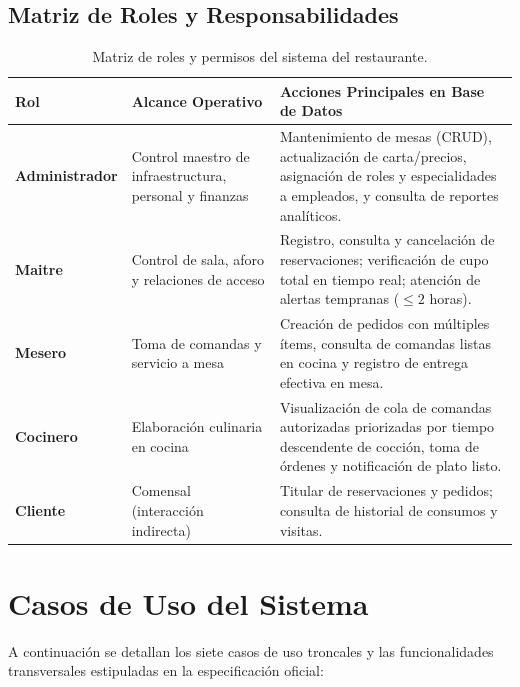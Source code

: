 \documentclass[11pt,letterpaper]{article}
\begin{document}
\subsection{Matriz de Roles y Responsabilidades}
\begin{table}[h!]
\centering
\small
\begin{tabularx}{\textwidth}{l p{4.2cm} X}
\toprule
\textbf{Rol} & \textbf{Alcance Operativo} & \textbf{Acciones Principales en Base de Datos} \\
\midrule
\textbf{Administrador} & Control maestro de infraestructura, personal y finanzas & Mantenimiento de mesas (CRUD), actualización de carta/precios, asignación de roles y especialidades a empleados, y consulta de reportes analíticos. \\
\addlinespace
\textbf{Maitre} & Control de sala, aforo y relaciones de acceso & Registro, consulta y cancelación de reservaciones; verificación de cupo total en tiempo real; atención de alertas tempranas ($\le 2$ horas). \\
\addlinespace
\textbf{Mesero} & Toma de comandas y servicio a mesa & Creación de pedidos con múltiples ítems, consulta de comandas listas en cocina y registro de entrega efectiva en mesa. \\
\addlinespace
\textbf{Cocinero} & Elaboración culinaria en cocina & Visualización de cola de comandas autorizadas priorizadas por tiempo descendente de cocción, toma de órdenes y notificación de plato listo. \\
\addlinespace
\textbf{Cliente} & Comensal (interacción indirecta) & Titular de reservaciones y pedidos; consulta de historial de consumos y visitas. \\
\bottomrule
\end{tabularx}
\caption{Matriz de roles y permisos del sistema del restaurante.}
\label{tab:roles}
\end{table}

\newpage
\section{Casos de Uso del Sistema}

A continuación se detallan los siete casos de uso troncales y las funcionalidades transversales estipuladas en la especificación oficial:
\end{document}
